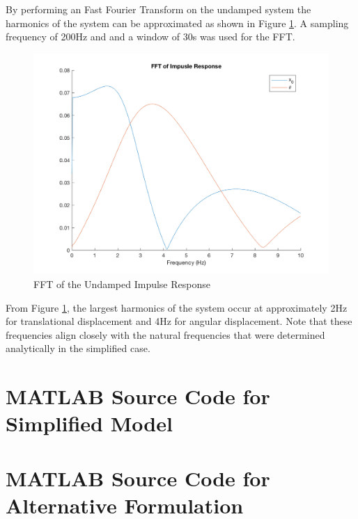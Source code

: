 \documentclass[12pt]{article}
\begin{document}
By performing an Fast Fourier Transform on the undamped system the harmonics of the system can be approximated as shown in Figure \ref{fig:fftImpResp}. A sampling frequency of 200Hz and and a window of 30s was used for the FFT.
\begin{figure}[h!]
	\centering
	\includegraphics[width=.8\textwidth]{./matlab/fftImpResp.png}
	\caption{FFT of the Undamped Impulse Response}
	\label{fig:fftImpResp}
\end{figure}
From Figure \ref{fig:fftImpResp}, the largest harmonics of the system occur at approximately 2Hz for translational displacement and 4Hz for angular displacement. Note that these frequencies align closely with the natural frequencies that were determined analytically in the simplified case.  

\pagebreak
{}


\pagebreak
\appendix
\section{MATLAB Source Code for Simplified Model}
\label{app:simple}

\pagebreak
\section{MATLAB Source Code for Alternative Formulation}
\label{app:alternative}

\end{document}
